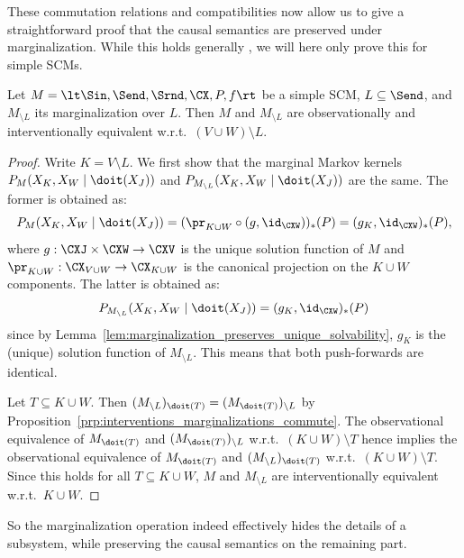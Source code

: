 These commutation relations and compatibilities now allow us to give a straightforward proof that
the causal semantics are preserved under marginalization.
While this holds generally \cite{BFPM21}, we will here only prove this for simple SCMs.
\begin{Thm}\label{Thm:various_equiv_marginalization}
  Let $M = \lt \Sin, \Send, \Srnd, \CX, P, f \rt$ be a simple SCM, $L \subseteq \Send$, and
  $M_{\setminus L}$ its marginalization over $L$. Then $M$ and $M_{\setminus L}$ are observationally
  and interventionally equivalent w.r.t.\ $(V \cup W) \setminus L$.
\end{Thm}
\begin{proof}
  Write $K = V \setminus L$.
  We first show that the marginal Markov kernels $P_{M}(X_K,X_W \mid \doit(X_J))$ and $P_{M_{\setminus L}}(X_K,X_W \mid \doit(X_J))$ are the same.
  The former is obtained as:
  $$P_{M}(X_K,X_W \mid \doit(X_J)) = (\pr_{K\cup W} \circ (g,\id_{\CXW}))_*(P) = (g_{K},\id_{\CXW})_*(P),$$
  where $g : \CXJ \times \CXW \to \CXV$ is the unique solution function of $M$ and
  $\pr_{K\cup W} : \CX_{V \cup W} \to \CX_{K\cup W}$ is the canonical projection on the $K\cup W$ components. 
  The latter is obtained as:
  $$P_{M_{\setminus L}}(X_K,X_W \mid \doit(X_J)) = (g_K,\id_{\CXW})_*(P)$$
  since by Lemma~\ref{lem:marginalization_preserves_unique_solvability}, $g_K$ is the (unique) solution function of $M_{\setminus L}$.
  This means that both push-forwards are identical.

  Let $T \subseteq K \cup W$. Then $(M_{\setminus L})_{\doit(T)} = (M_{\doit(T)})_{\setminus L}$ by
  Proposition~\ref{prp:interventions_marginalizations_commute}. 
  The observational equivalence of $M_{\doit(T)}$ and $(M_{\doit(T)})_{\setminus L}$ w.r.t.\ $(K \cup W) \setminus T$ hence implies the observational equivalence of $M_{\doit(T)}$ and $(M_{\setminus L})_{\doit(T)}$ w.r.t.\ $(K \cup W) \setminus T$. 
  Since this holds for all $T \subseteq K \cup W$, $M$ and $M_{\setminus L}$ are interventionally equivalent w.r.t.\ $K \cup W$.
\end{proof}
So the marginalization operation indeed effectively hides the details of a subsystem, while preserving the causal semantics on the remaining part.
